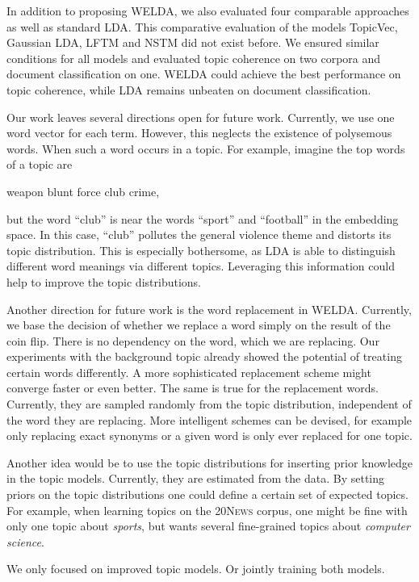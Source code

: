 \documentclass[
        a4paper,
        titlepage,
        twoside,
        parskip,
        numbers=noenddot
        ]{scrbook}
\newcommand{\topicbox}[1]{
  \setlength{\OuterFrameSep}{0pt}
  \begin{framed}
    #1
  \end{framed}
}
\theoremstyle{break}
\begin{document}
In addition to proposing WELDA, we also evaluated four comparable approaches as well as standard LDA.
This comparative evaluation of the models TopicVec, Gaussian LDA, LFTM and NSTM did not exist before.
We ensured similar conditions for all models and evaluated topic coherence on two corpora and document classification on one.
WELDA could achieve the best performance on topic coherence, while LDA remains unbeaten on document classification.

Our work leaves several directions open for future work.
Currently, we use one word vector for each term.
However, this neglects the existence of polysemous words.
When such a word occurs in a topic.
For example, imagine the top words of a topic are
\topicbox{weapon blunt force club crime,} but the word ``club'' is near the words ``sport'' and ``football'' in the embedding space.
In this case, ``club'' pollutes the general violence theme and distorts its topic distribution.
This is especially bothersome, as LDA is able to distinguish different word meanings via different topics.
Leveraging this information could help to improve the topic distributions.

Another direction for future work is the word replacement in WELDA.
Currently, we base the decision of whether we replace a word simply on the result of the coin flip.
There is no dependency on the word, which we are replacing.
Our experiments with the background topic already showed the potential of treating certain words differently.
A more sophisticated replacement scheme might converge faster or even better.
The same is true for the replacement words.
Currently, they are sampled randomly from the topic distribution, independent of the word they are replacing.
More intelligent schemes can be devised, for example only replacing exact synonyms or a given word is only ever replaced for one topic.

Another idea would be to use the topic distributions for inserting prior knowledge in the topic models.
Currently, they are estimated from the data.
By setting priors on the topic distributions one could define a certain set of expected topics.
For example, when learning topics on the \textsc{20News} corpus, one might be fine with only one topic about \emph{sports}, but wants several fine-grained topics about \emph{computer science}.

We only focused on improved topic models.
Or jointly training both models.
\end{document}
